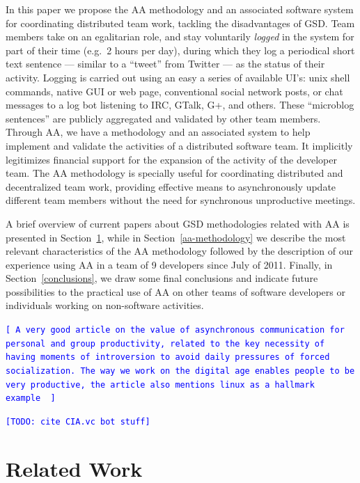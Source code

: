 \documentclass[letterpaper]{article}
\newcommand{\indraftnote}[1]{\textcolor{blue}{\texttt{\footnotesize[#1]}}}
\newcommand{\todo}[1]{\indraftnote{todo: #1}}
\begin{document}
In this paper we propose the AA methodology and an associated software system
for coordinating distributed team work, tackling the disadvantages
of GSD. Team members take on an egalitarian role, and stay
voluntarily \textit{logged} in the system for part of their time
(e.g.\ 2 hours per day), during which they log a periodical short text
sentence --- similar to a ``tweet'' from Twitter --- as the
status of their activity. Logging is carried out using an easy a series of
available UI's: unix shell
commands, native GUI or web page, conventional social network posts, or chat messages to a log bot
listening to IRC, GTalk, G+, and others.  These ``microblog sentences'' are publicly aggregated and validated by other
team members. Through AA, we have a methodology and an associated system to help
implement and validate the activities of a distributed software team. It implicitly
legitimizes financial support for the expansion of the activity of the developer
team. The AA methodology is specially useful for coordinating distributed and
decentralized team work, providing effective means to asynchronously update
different team members without the need for synchronous unproductive meetings.


A brief overview of current papers about GSD methodologies related with
AA is presented in Section~\ref{related-work}, while in
Section~\ref{aa-methodology} we describe the most relevant
characteristics of the AA methodology followed by the description of
our experience using AA in a team of 9 developers since July of
2011. Finally, in Section~\ref{conclusions}, we draw some final
conclusions and indicate future possibilities to the
practical use of AA on other teams of software developers or
individuals working on non-software activities.

\indraftnote{
A very good article on the value of asynchronous communication for personal
and group productivity, related to the key necessity of having moments of
introversion to avoid daily pressures of forced socialization. The way we work
on the digital age enables people to be very productive, the article also
mentions linux as a hallmark example~\cite{Thompson:Wired:2012}
}

\indraftnote{TODO: cite CIA.vc bot stuff}

\section{Related Work}
\label{related-work}
\end{document}
